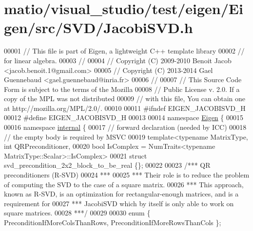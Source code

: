 \hypertarget{matio_2visual__studio_2test_2eigen_2_eigen_2src_2_s_v_d_2_jacobi_s_v_d_8h_source}{}\section{matio/visual\+\_\+studio/test/eigen/\+Eigen/src/\+S\+V\+D/\+Jacobi\+S\+VD.h}
\label{matio_2visual__studio_2test_2eigen_2_eigen_2src_2_s_v_d_2_jacobi_s_v_d_8h_source}

\begin{DoxyCode}
00001 \textcolor{comment}{// This file is part of Eigen, a lightweight C++ template library}
00002 \textcolor{comment}{// for linear algebra.}
00003 \textcolor{comment}{//}
00004 \textcolor{comment}{// Copyright (C) 2009-2010 Benoit Jacob <jacob.benoit.1@gmail.com>}
00005 \textcolor{comment}{// Copyright (C) 2013-2014 Gael Guennebaud <gael.guennebaud@inria.fr>}
00006 \textcolor{comment}{//}
00007 \textcolor{comment}{// This Source Code Form is subject to the terms of the Mozilla}
00008 \textcolor{comment}{// Public License v. 2.0. If a copy of the MPL was not distributed}
00009 \textcolor{comment}{// with this file, You can obtain one at http://mozilla.org/MPL/2.0/.}
00010 
00011 \textcolor{preprocessor}{#ifndef EIGEN\_JACOBISVD\_H}
00012 \textcolor{preprocessor}{#define EIGEN\_JACOBISVD\_H}
00013 
00014 \textcolor{keyword}{namespace }\hyperlink{namespace_eigen}{Eigen} \{ 
00015 
00016 \textcolor{keyword}{namespace }\hyperlink{namespaceinternal}{internal} \{
00017 \textcolor{comment}{// forward declaration (needed by ICC)}
00018 \textcolor{comment}{// the empty body is required by MSVC}
00019 \textcolor{keyword}{template}<\textcolor{keyword}{typename} MatrixType, \textcolor{keywordtype}{int} QRPreconditioner,
00020          \textcolor{keywordtype}{bool} IsComplex = NumTraits<typename MatrixType::Scalar>::IsComplex>
00021 \textcolor{keyword}{struct }svd\_precondition\_2x2\_block\_to\_be\_real \{\};
00022 
00023 \textcolor{comment}{/*** QR preconditioners (R-SVD)}
00024 \textcolor{comment}{ ***}
00025 \textcolor{comment}{ *** Their role is to reduce the problem of computing the SVD to the case of a square matrix.}
00026 \textcolor{comment}{ *** This approach, known as R-SVD, is an optimization for rectangular-enough matrices, and is a
       requirement for}
00027 \textcolor{comment}{ *** JacobiSVD which by itself is only able to work on square matrices.}
00028 \textcolor{comment}{ ***/}
00029 
00030 \textcolor{keyword}{enum} \{ PreconditionIfMoreColsThanRows, PreconditionIfMoreRowsThanCols \};

\end{DoxyCode}
